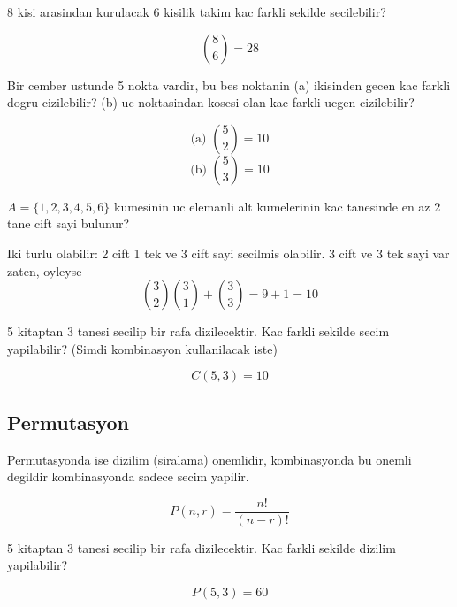 \documentclass{ximera}
\begin{document}
\begin{example}
8 kisi arasindan kurulacak 6 kisilik takim kac farkli sekilde secilebilir?
\end{example}
\begin{explanation}
$$
\binom{8}{6} = 28
$$
\end{explanation}

\begin{example}
Bir cember ustunde 5 nokta vardir, bu bes noktanin (a) ikisinden gecen  kac farkli dogru cizilebilir? (b) uc noktasindan kosesi olan kac farkli ucgen cizilebilir?
\end{example}
\begin{explanation}
$$
\text{(a)    } \binom{5}{2} = 10
$$
$$
\text{(b)    } \binom{5}{3} = 10
$$
\end{explanation}

\begin{example}
$A = \{1, 2, 3, 4, 5, 6\}$ kumesinin uc elemanli alt kumelerinin kac tanesinde en az 2 tane cift sayi bulunur?
\end{example}
\begin{explanation}
Iki turlu olabilir: 2 cift 1 tek ve 3 cift sayi secilmis olabilir. 3 cift ve 3 tek sayi var zaten, oyleyse
$$
\binom{3}{2}\binom{3}{1} + \binom{3}{3} = 9 + 1 = 10
$$
\end{explanation}


\begin{example}
5 kitaptan 3 tanesi secilip bir rafa dizilecektir. Kac farkli sekilde secim yapilabilir? (Simdi kombinasyon kullanilacak iste)
\end{example}
\begin{explanation}
$$
C(5,3) = 10
$$
\end{explanation}


\subsection{Permutasyon}
Permutasyonda ise dizilim (siralama) onemlidir, kombinasyonda bu onemli degildir kombinasyonda sadece secim yapilir. 

\begin{equation}
    P(n,r) = \frac{n!}{(n-r)!}
\end{equation}

\begin{example}
5 kitaptan 3 tanesi secilip bir rafa dizilecektir. Kac farkli sekilde dizilim yapilabilir?
\end{example}
\begin{explanation}
$$
P(5,3) = 60
$$
\end{explanation}
\end{document}
